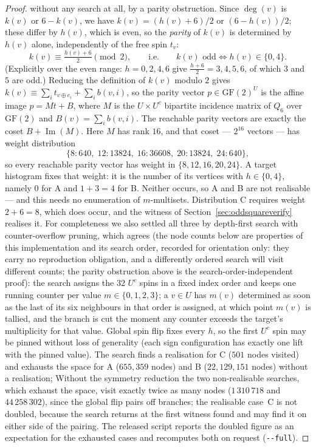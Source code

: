\documentclass[12pt]{article}
\begin{document}
\begin{proof}
without any search at all, by a parity obstruction. Since $\deg(v)$ is
$k(v)$ or $6-k(v)$, we have $k(v)=(h(v)+6)/2$ or $(6-h(v))/2$; these differ by
$h(v)$, which is even, so the \emph{parity} of $k(v)$ is determined by $h(v)$
alone, independently of the free spin $t_v$:
\[
k(v)\equiv\tfrac{h(v)+6}{2}\pmod 2,
\qquad\text{i.e.}\qquad
k(v)\text{ odd}\iff h(v)\in\{0,4\}.
\]
(Explicitly over the even range: $h=0,2,4,6$ give
$\tfrac{h+6}{2}=3,4,5,6$, of which $3$ and $5$ are odd.)
Reducing the definition of $k(v)$ modulo $2$ gives
$k(v)\equiv\sum_i t_{v\oplus e_i}+\sum_i b(v,i)$, so the parity vector
$p\in\mathrm{GF}(2)^{U}$ is the affine image $p=Mt+B$, where $M$ is the
$U\times U^{c}$ bipartite incidence matrix of $Q_6$ over $\mathrm{GF}(2)$ and
$B(v)=\sum_i b(v,i)$. The reachable parity vectors are exactly the coset
$B+\operatorname{Im}(M)$. Here $M$ has rank $16$, and that coset --- $2^{16}$
vectors --- has weight distribution
\[
\{8{:}640,\;12{:}13824,\;16{:}36608,\;20{:}13824,\;24{:}640\},
\]
so every reachable parity vector has weight in $\{8,12,16,20,24\}$. A target
histogram fixes that weight: it is the number of its vertices with
$h\in\{0,4\}$, namely $0$ for A and $1+3=4$ for B. Neither occurs, so A and B
are not realisable --- and this needs no enumeration of $m$-multisets.
Distribution C requires weight $2+6=8$, which does occur, and the witness of
Section~\ref{sec:oddsquareverify} realises it.
For completeness we also settled all three by
depth-first search with counter-overflow pruning, which agrees (the node
counts below are properties of this implementation and its search order,
recorded for orientation only: they carry no reproduction obligation, and a
differently ordered search will visit different counts; the parity
obstruction above is the search-order-independent proof): the search assigns
the $32$ $U^{c}$ spins in a fixed index order and keeps one running counter
per value $m\in\{0,1,2,3\}$; a $v\in U$ has $m(v)$ determined as soon as the
last of its six neighbours in that order is assigned, at which point $m(v)$
is tallied, and the branch is cut the moment any counter exceeds the
target's multiplicity for that value. Global spin
flip fixes every $h$, so the first $U^{c}$ spin may be pinned without
loss of generality (each sign configuration has exactly one lift with the
pinned value). The search finds a
realisation for C ($501$ nodes visited) and exhausts the space for A
($655{,}359$ nodes) and B ($22{,}129{,}151$ nodes) without a realisation;
Without the symmetry reduction the two non-realisable searches, which exhaust
the space, visit exactly twice as many nodes ($1\,310\,718$ and $44\,258\,302$),
since the global flip pairs off branches; the realisable case~C is not doubled,
because the search returns at the first witness found and may find it on either
side of the pairing. The released script reports the doubled figure as an
expectation for the exhausted cases and recomputes both on request
(\texttt{-{}-full}).
\end{proof}
\end{document}
